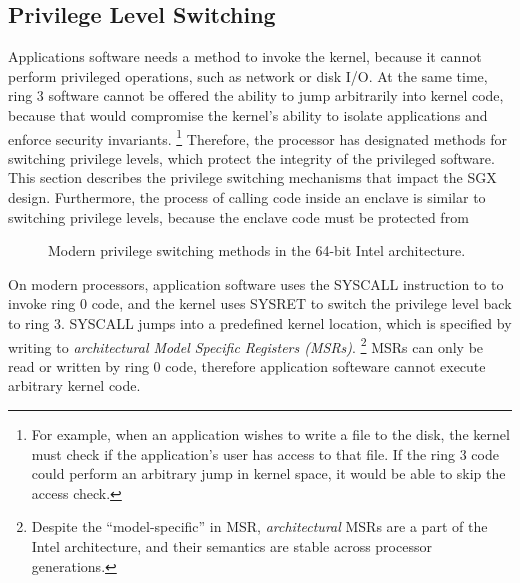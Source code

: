 \subsection{Privilege Level Switching}
\label{sec:faults}

Applications software needs a method to invoke the kernel, because it cannot
perform privileged operations, such as network or disk I/O. At the same time,
ring 3 software cannot be offered the ability to jump arbitrarily into kernel
code, because that would compromise the kernel's ability to isolate
applications and enforce security invariants.
\footnote{For example, when an application wishes to write a file to the disk,
the kernel must check if the application's user has access to that file. If the
ring 3 code could perform an arbitrary jump in kernel space, it would be able
to skip the access check.}
Therefore, the processor has designated methods for switching privilege levels,
which protect the integrity of the privileged software.  This section describes
the privilege switching mechanisms that impact the SGX design. Furthermore,
the process of calling code inside an enclave is similar to switching
privilege levels, because the enclave code must be protected from


\begin{figure}[hbt]
  \caption{
    Modern privilege switching methods in the 64-bit Intel architecture.
  }
  \label{fig:cpu_ring_switch}
\end{figure}

On modern processors, application software uses the SYSCALL instruction to
to invoke ring 0 code, and the kernel uses SYSRET to switch the privilege level
back to ring 3. SYSCALL jumps into a predefined kernel location, which is
specified by writing to \textit{architectural Model Specific Registers (MSRs)}.
\footnote{Despite the ``model-specific'' in MSR, \textit{architectural} MSRs
are a part of the Intel architecture, and their semantics are stable across
processor generations.} MSRs can only be read or written by ring 0 code,
therefore application softeware cannot execute arbitrary kernel code.

